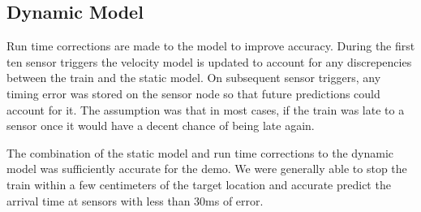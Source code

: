 \documentclass[twoside,a4paper]{refart}
\begin{document}
\subsection{Dynamic Model}

Run time corrections are made to the model to improve accuracy. During the first ten sensor triggers the velocity model is updated to account for any discrepencies between the train and the static model. On subsequent sensor triggers, any timing error was stored on the sensor node so that future predictions could account for it. The assumption was that in most cases, if the train was late to a sensor once it would have a decent chance of being late again. 

The combination of the static model and run time corrections to the dynamic model was sufficiently accurate for the demo. We were generally able to stop the train within a few centimeters of the target location and accurate predict the arrival time at sensors with less than 30ms of error.
\end{document}
